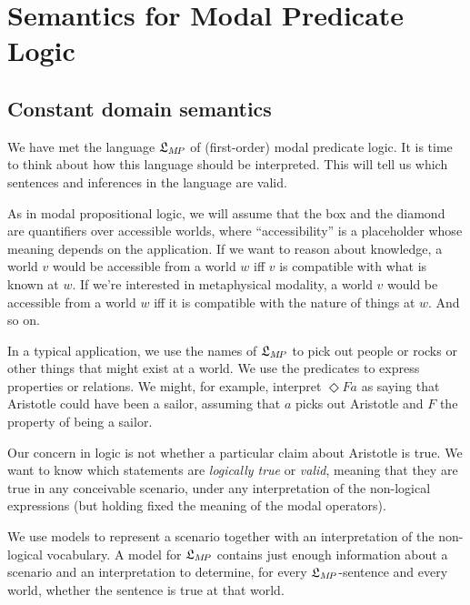 \chapter{Semantics for Modal Predicate Logic}\label{ch:qml2}

\section{Constant domain semantics}\label{sec:constantdomainsemantics}

We have met the language $\mathfrak{L}_{M\!P}$ of (first-order) modal predicate logic. It
is time to think about how this language should be interpreted. This will tell
us which sentences and inferences in the language are valid.

As in modal propositional logic, we will assume that the box and the diamond are
quantifiers over accessible worlds, where ``accessibility'' is a placeholder
whose meaning depends on the application. If we want to reason about knowledge,
a world $v$ would be accessible from a world $w$ iff $v$ is compatible with what
is known at $w$. If we're interested in metaphysical modality, a world $v$
would be accessible from a world $w$ iff it is compatible with the nature of
things at $w$. And so on.

In a typical application, we use the names of $\mathfrak{L}_{M\!P}$ to pick out people or
rocks or other things that might exist at a world. We use the predicates to
express properties or relations. We might, for example, interpret $\Diamond Fa$
as saying that Aristotle could have been a sailor, assuming that $a$ picks out
Aristotle and $F$ the property of being a sailor.

Our concern in logic is not whether a particular claim about Aristotle is true. We
want to know which statements are \emph{logically true} or \emph{valid}, meaning
that they are true in any conceivable scenario, under any interpretation of the
non-logical expressions (but holding fixed the meaning of the modal operators).

We use models to represent a scenario together with an interpretation of the
non-logical vocabulary. A model for $\mathfrak{L}_{M\!P}$ contains just enough information
about a scenario and an interpretation to determine, for every
$\mathfrak{L}_{M\!P}$-sentence and every world, whether the sentence is true at that
world.

